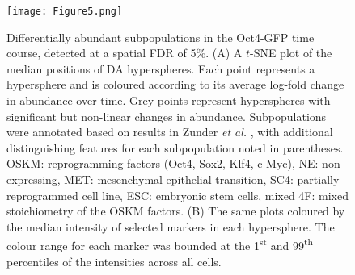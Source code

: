 \documentclass{article}
\begin{document}
\begin{figure}[p]
    \begin{center}
    \texttt{[image: Figure5.png]}
\end{center}
    \caption{
        Differentially abundant subpopulations in the Oct4-GFP time course, detected at a spatial FDR of 5\%.
        (A) A $t$-SNE plot of the median positions of DA hyperspheres. 
        Each point represents a hypersphere and is coloured according to its average log-fold change in abundance over time.
        Grey points represent hyperspheres with significant but non-linear changes in abundance.
        Subpopulations were annotated based on results in Zunder \emph{et al.} \cite{zunder2015continuous}, with additional distinguishing features for each subpopulation noted in parentheses.
        OSKM: reprogramming factors (Oct4, Sox2, Klf4, c-Myc), NE: non-expressing, MET: mesenchymal-epithelial transition, SC4: partially reprogrammed cell line, ESC: embryonic stem cells, mixed 4F: mixed stoichiometry of the OSKM factors.
        (B) The same plots coloured by the median intensity of selected markers in each hypersphere.
        The colour range for each marker was bounded at the 1\textsuperscript{st} and 99\textsuperscript{th} percentiles of the intensities across all cells.
    }

    \label{fig:oct4}
\end{figure}
\end{document}
